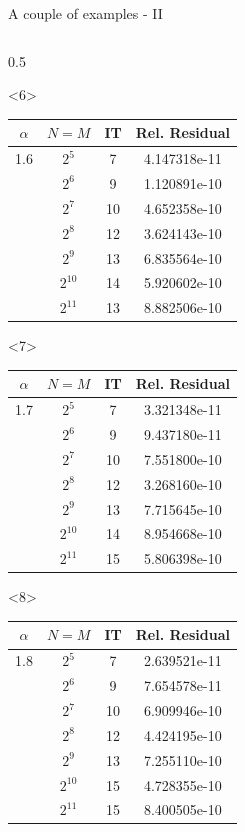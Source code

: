 \documentclass[aspectratio=169,xcolor=dvipsnames]{beamer}
\begin{document}
\begin{frame}[fragile]{A couple of examples - II}
\begin{columns}
\begin{column}{0.5\columnwidth}
\begin{onlyenv}
		\end{onlyenv}
		\begin{onlyenv}<6>
			\centering
			
			\begin{tabular}{cccc}
				\toprule
				$\alpha$ & $N = M$ & IT & Rel. Residual \\
				\midrule
 1.6 & $2^{5}$ & 7 & 4.147318e-11 \\
& $2^{6}$ & 9 & 1.120891e-10 \\
& $2^{7}$ & 10 & 4.652358e-10 \\
& $2^{8}$ & 12 & 3.624143e-10 \\
& $2^{9}$ & 13 & 6.835564e-10 \\
& $2^{10}$ & 14 & 5.920602e-10 \\
& $2^{11}$ & 13 & 8.882506e-10 \\
				\bottomrule
			\end{tabular}
			
		\end{onlyenv}
		\begin{onlyenv}<7>
			\centering
			
			\begin{tabular}{cccc}
				\toprule
				$\alpha$ & $N = M$ & IT & Rel. Residual \\
				\midrule
 1.7 & $2^{5}$ & 7 & 3.321348e-11 \\
& $2^{6}$ & 9 & 9.437180e-11 \\
& $2^{7}$ & 10 & 7.551800e-10 \\
& $2^{8}$ & 12 & 3.268160e-10 \\
& $2^{9}$ & 13 & 7.715645e-10 \\
& $2^{10}$ & 14 & 8.954668e-10 \\
& $2^{11}$ & 15 & 5.806398e-10 \\
				\bottomrule
			\end{tabular}
			
		\end{onlyenv}
		\begin{onlyenv}<8>
			\centering
			
			\begin{tabular}{cccc}
				\toprule
				$\alpha$ & $N = M$ & IT & Rel. Residual \\
				\midrule
 1.8 & $2^{5}$ & 7 & 2.639521e-11 \\
& $2^{6}$ & 9 & 7.654578e-11 \\
& $2^{7}$ & 10 & 6.909946e-10 \\
& $2^{8}$ & 12 & 4.424195e-10 \\
& $2^{9}$ & 13 & 7.255110e-10 \\
& $2^{10}$ & 15 & 4.728355e-10 \\
& $2^{11}$ & 15 & 8.400505e-10 \\
				\bottomrule
			\end{tabular}
			

\end{onlyenv}
\end{column}
\end{columns}
\end{frame}
\end{document}
